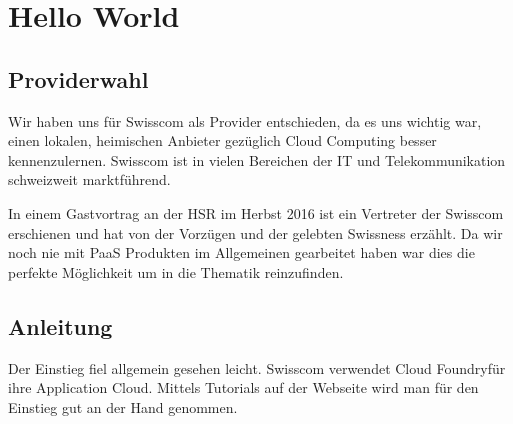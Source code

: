 \chapter{Hello World}
\section{Providerwahl}
Wir haben uns für Swisscom als Provider entschieden, da es uns wichtig war, einen lokalen, heimischen Anbieter gezüglich Cloud Computing besser kennenzulernen. Swisscom ist in vielen Bereichen der IT und Telekommunikation schweizweit marktführend. 

In einem Gastvortrag an der HSR im Herbst 2016 ist ein Vertreter der Swisscom erschienen und hat von der Vorzügen und der gelebten Swissness erzählt. Da wir noch nie mit PaaS Produkten im Allgemeinen gearbeitet haben war dies die perfekte Möglichkeit um in die Thematik reinzufinden. 
\section{Anleitung}
Der Einstieg fiel allgemein gesehen leicht. Swisscom verwendet \glqq Cloud Foundry\grqq für ihre Application Cloud. Mittels Tutorials auf der Webseite wird man für den Einstieg gut \glqq an der Hand genommen\grqq .

